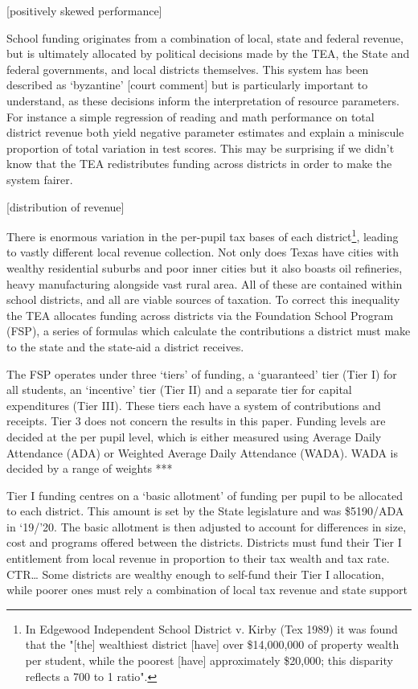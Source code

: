 \documentclass[11pt]{article}
\begin{document}
[positively skewed performance]

School funding originates from a combination of local, state and federal revenue, but is ultimately allocated by political decisions made by the TEA, the State and federal governments, and local districts themselves. This system has been described as ‘byzantine’ [court comment] but is particularly important to understand, as these decisions inform the interpretation of resource parameters. For instance a simple regression of reading and math performance on total district revenue both yield negative parameter estimates and explain a miniscule proportion of total variation in test scores. This may be surprising if we didn’t know that the TEA redistributes funding across districts in order to make the system fairer. 

[distribution of revenue]

There is enormous variation in the per-pupil tax bases of each district\footnote{In Edgewood Independent School District v. Kirby (Tex 1989) it was found that the "[the] wealthiest district [have] over \$14,000,000 of property wealth per student, while the poorest [have] approximately \$20,000; this disparity reflects a 700 to 1 ratio". }, leading to vastly different local revenue collection. Not only does Texas have cities with wealthy residential suburbs and poor inner cities but it also boasts oil refineries, heavy manufacturing alongside vast rural area. All of these are contained within school districts, and all are viable sources of taxation. To correct this inequality the TEA allocates funding across districts via the Foundation School Program (FSP), a series of formulas which calculate the contributions a district must make to the state and the state-aid a district receives. 

The FSP operates under three ‘tiers’ of funding, a ‘guaranteed’ tier (Tier I) for all students, an ‘incentive’ tier (Tier II) and a separate tier for capital expenditures (Tier III). These tiers each have a system of contributions and receipts. Tier 3 does not concern the results in this paper. Funding levels are decided at the per pupil level, which is either measured using Average Daily Attendance (ADA) or Weighted Average Daily Attendance (WADA). WADA is decided by a range of weights ***
  
  
  Tier I funding centres on a ‘basic allotment’ of funding per pupil to be allocated to each district. This amount is set by the State legislature and was \$5190/ADA in ‘19/’20. The basic allotment is then adjusted to account for differences in size, cost and programs offered between the districts. Districts must fund their Tier I entitlement from local revenue in proportion to their tax wealth and tax rate. CTR… Some districts are wealthy enough to self-fund their Tier I allocation, while poorer ones must rely a combination of local tax revenue and state support
\end{document}
